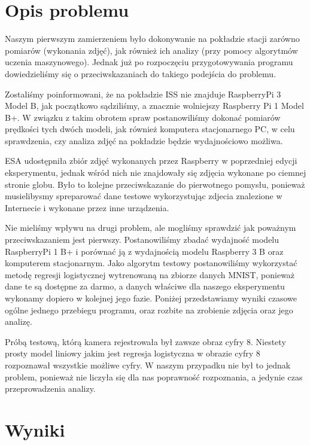 \section{Opis problemu}\label{sec:performance_introduction}

Naszym pierwszym zamierzeniem było dokonywanie na pokładzie stacji zarówno pomiarów
(wykonania zdjęć), jak również ich analizy (przy pomocy algorytmów uczenia maszynowego). Jednak już po
rozpoczęciu przygotowywania programu dowiedzieliśmy się o przeciwskazaniach do takiego
podejścia do problemu.

Zostaliśmy poinformowani, że na pokładzie ISS nie znajduje RaspberryPi 3
Model B, jak początkowo sądziliśmy, a znacznie wolniejszy Raspberry Pi 1 Model B+. W związku
z takim obrotem spraw postanowiliśmy dokonać pomiarów prędkości tych dwóch modeli, jak
również komputera stacjonarnego PC, w celu sprawdzenia, czy analiza zdjęć na pokładzie będzie
wydajnościowo możliwa.

ESA udostępniła zbiór zdjęć wykonanych przez Raspberry w poprzedniej edycji eksperymentu, jednak
wśród nich nie znajdowały się zdjęcia wykonane po ciemnej stronie globu. Było to kolejne przeciwskazanie
do pierwotnego pomysłu, ponieważ musielibysmy spreparować dane testowe wykorzystując zdjecia znalezione
w Internecie i wykonane przez inne urządzenia.

Nie mieliśmy wpływu na drugi problem, ale mogliśmy sprawdzić jak poważnym przeciwskazaniem jest pierwszy.
Postanowiliśmy zbadać wydajność modelu RaspberryPi 1 B+ i porównać ją z wydajnością modelu Raspberry 3 B oraz
komputerem stacjonarnym. Jako algorytm testowy postanowiliśmy wykorzystać metodę regresji logistycznej
wytrenowaną na zbiorze danych MNIST, ponieważ dane te są dostępne za darmo, a danych właściwe dla naszego
eksperymentu wykonamy dopiero w kolejnej jego fazie. Poniżej przedstawiamy wyniki czasowe ogólne jednego
przebiegu programu, oraz rozbite na zrobienie zdjęcia oraz jego analizę.

Próbą testową, którą kamera rejestrowała był zawsze obraz cyfry 8. Niestety prosty model liniowy jakim jest
regresja logistyczna w obrazie cyfry 8 rozpoznawał wszystkie możliwe cyfry. W naszym przypadku nie był to
jednak problem, ponieważ nie liczyła się dla nas poprawność rozpoznania, a jedynie czas przeprowadzenia analizy.

\section{Wyniki}\label{sec:performance_results}

